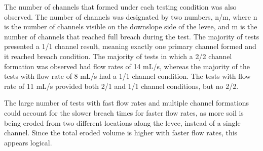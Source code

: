 The number of channels that formed under each testing condition was also observed. The number of channels was designated by two numbers, n/m, where n is the number of channels visible on the downslope side of the levee, and m is the number of channels that reached full breach during the test. The majority of tests presented a 1/1 channel result, meaning exactly one primary channel formed and it reached breach condition. The majority of tests in which a 2/2 channel formation was observed had flow rates of 14 mL/s, whereas the majority of the tests with flow rate of 8 mL/s had a 1/1 channel condition. The tests with flow rate of 11 mL/s provided both 2/1 and 1/1 channel conditions, but no 2/2.

The large number of tests with fast flow rates and multiple channel formations could account for the slower breach times for faster flow rates, as more soil is being eroded from two different locations along the levee, instead of a single channel. Since the total eroded volume is higher with faster flow rates, this appears logical.

% 
% 
% 



